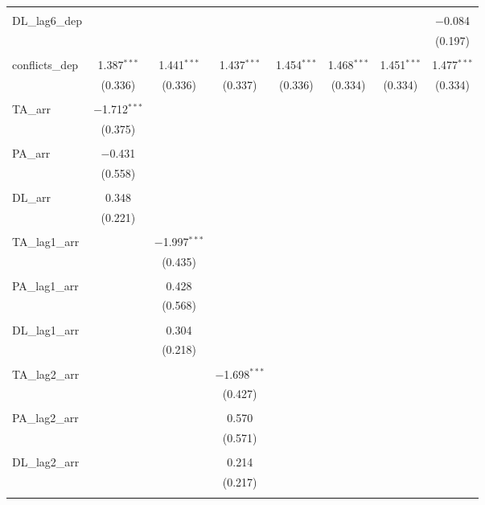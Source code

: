 \begin{table}[!htbp]
\begin{tabular}{@{\extracolsep{5pt}}lccccccc}
  & & & & & & & \\ 
 DL\_lag6\_dep &  &  &  &  &  &  & $-$0.084 \\ 
  &  &  &  &  &  &  & (0.197) \\ 
  & & & & & & & \\ 
 conflicts\_dep & 1.387$^{***}$ & 1.441$^{***}$ & 1.437$^{***}$ & 1.454$^{***}$ & 1.468$^{***}$ & 1.451$^{***}$ & 1.477$^{***}$ \\ 
  & (0.336) & (0.336) & (0.337) & (0.336) & (0.334) & (0.334) & (0.334) \\ 
  & & & & & & & \\ 
 TA\_arr & $-$1.712$^{***}$ &  &  &  &  &  &  \\ 
  & (0.375) &  &  &  &  &  &  \\ 
  & & & & & & & \\ 
 PA\_arr & $-$0.431 &  &  &  &  &  &  \\ 
  & (0.558) &  &  &  &  &  &  \\ 
  & & & & & & & \\ 
 DL\_arr & 0.348 &  &  &  &  &  &  \\ 
  & (0.221) &  &  &  &  &  &  \\ 
  & & & & & & & \\ 
 TA\_lag1\_arr &  & $-$1.997$^{***}$ &  &  &  &  &  \\ 
  &  & (0.435) &  &  &  &  &  \\ 
  & & & & & & & \\ 
 PA\_lag1\_arr &  & 0.428 &  &  &  &  &  \\ 
  &  & (0.568) &  &  &  &  &  \\ 
  & & & & & & & \\ 
 DL\_lag1\_arr &  & 0.304 &  &  &  &  &  \\ 
  &  & (0.218) &  &  &  &  &  \\ 
  & & & & & & & \\ 
 TA\_lag2\_arr &  &  & $-$1.698$^{***}$ &  &  &  &  \\ 
  &  &  & (0.427) &  &  &  &  \\ 
  & & & & & & & \\ 
 PA\_lag2\_arr &  &  & 0.570 &  &  &  &  \\ 
  &  &  & (0.571) &  &  &  &  \\ 
  & & & & & & & \\ 
 DL\_lag2\_arr &  &  & 0.214 &  &  &  &  \\ 
  &  &  & (0.217) &  &  &  &  \\ 
  & & & & & & & \\ 

\end{tabular}
\end{table}
